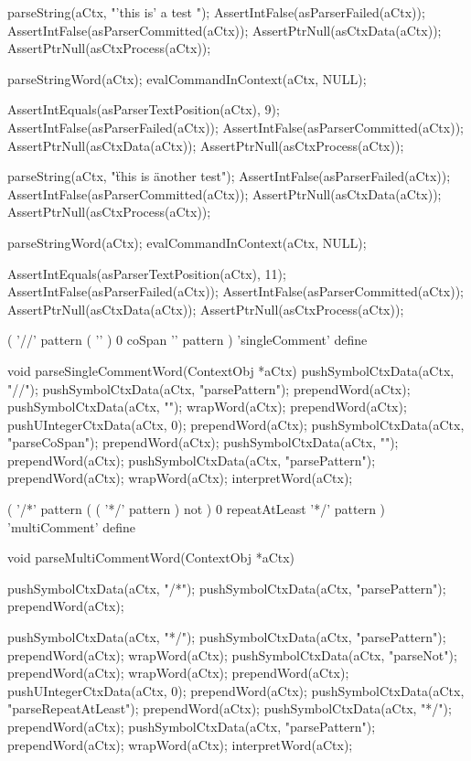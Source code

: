 \startCTest
  parseString(aCtx, "'this is' a test ");
  AssertIntFalse(asParserFailed(aCtx));
  AssertIntFalse(asParserCommitted(aCtx));
  AssertPtrNull(asCtxData(aCtx));
  AssertPtrNull(asCtxProcess(aCtx));
  
  parseStringWord(aCtx);
  evalCommandInContext(aCtx, NULL);
  
  AssertIntEquals(asParserTextPosition(aCtx), 9);
  AssertIntFalse(asParserFailed(aCtx));
  AssertIntFalse(asParserCommitted(aCtx));
  AssertPtrNull(asCtxData(aCtx));
  AssertPtrNull(asCtxProcess(aCtx));
  
  parseString(aCtx, "\" this is \" another test");
  AssertIntFalse(asParserFailed(aCtx));
  AssertIntFalse(asParserCommitted(aCtx));
  AssertPtrNull(asCtxData(aCtx));
  AssertPtrNull(asCtxProcess(aCtx));
  
  parseStringWord(aCtx);
  evalCommandInContext(aCtx, NULL);
  
  AssertIntEquals(asParserTextPosition(aCtx), 11);
  AssertIntFalse(asParserFailed(aCtx));
  AssertIntFalse(asParserCommitted(aCtx));
  AssertPtrNull(asCtxData(aCtx));
  AssertPtrNull(asCtxProcess(aCtx));
\stopCTest
\stopTestCase
\stopTestSuite

\starttyping
(
  '//' pattern
  ( '\n' ) 0 coSpan
  '\n' pattern
) 'singleComment' define
\stoptyping

\startCCode
void parseSingleCommentWord(ContextObj *aCtx) {
  pushSymbolCtxData(aCtx, "//");
  pushSymbolCtxData(aCtx, "parsePattern");
  prependWord(aCtx);
  pushSymbolCtxData(aCtx, "\n");
  wrapWord(aCtx);
  prependWord(aCtx);
  pushUIntegerCtxData(aCtx, 0);
  prependWord(aCtx);
  pushSymbolCtxData(aCtx, "parseCoSpan");
  prependWord(aCtx);
  pushSymbolCtxData(aCtx, "\n");
  prependWord(aCtx);
  pushSymbolCtxData(aCtx, "parsePattern");
  prependWord(aCtx);
  wrapWord(aCtx);
  interpretWord(aCtx);
}
\stopCCode

\starttyping
(
  '/*' pattern
  ( ( '*/' pattern ) not ) 0 repeatAtLeast
  '*/' pattern
) 'multiComment' define
\stoptyping

\startCCode
void parseMultiCommentWord(ContextObj *aCtx) {
  pushSymbolCtxData(aCtx, "/*");
  pushSymbolCtxData(aCtx, "parsePattern");
  prependWord(aCtx);
  
  pushSymbolCtxData(aCtx, "*/");
  pushSymbolCtxData(aCtx, "parsePattern");
  prependWord(aCtx);
  wrapWord(aCtx);
  pushSymbolCtxData(aCtx, "parseNot");
  prependWord(aCtx);
  wrapWord(aCtx);
  prependWord(aCtx);
  pushUIntegerCtxData(aCtx, 0);
  prependWord(aCtx);
  pushSymbolCtxData(aCtx, "parseRepeatAtLeast");
  prependWord(aCtx);
  pushSymbolCtxData(aCtx, "*/");
  prependWord(aCtx);
  pushSymbolCtxData(aCtx, "parsePattern");
  prependWord(aCtx);
  wrapWord(aCtx);
  interpretWord(aCtx);
}
\stopCCode

